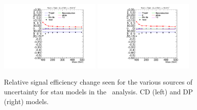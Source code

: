 \begin{figure}[ht]
\centering
  \includegraphics[clip=true, trim=0.0cm 0cm 2.8cm 0cm, width=0.44\textwidth]{figures/tkmu/MuGMStauUncertainty}
  \includegraphics[clip=true, trim=0.0cm 0cm 2.8cm 0cm, width=0.44\textwidth]{figures/tkmu/MuPPStauUncertainty} \\
\caption[Relative signal efficiency change seen for the various sources of uncertainty for stau models in the \tktof\ analysis]
{Relative signal efficiency change seen for the various sources of uncertainty for stau models in the \tktof\ analysis.
CD (left) and DP (right) models.}
    \label{fig:TkMuStauUncSource}
\end{figure}

